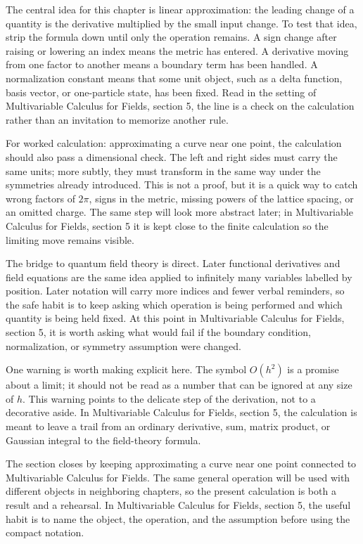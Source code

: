The central idea for this chapter is linear approximation: the leading change of a quantity is the derivative multiplied by the small input change.  To test that idea, strip the formula down until only the operation remains.  A sign change after raising or lowering an index means the metric has entered.  A derivative moving from one factor to another means a boundary term has been handled.  A normalization constant means that some unit object, such as a delta function, basis vector, or one-particle state, has been fixed.  Read in the setting of Multivariable Calculus for Fields, section 5, the line is a check on the calculation rather than an invitation to memorize another rule.

For worked calculation: approximating a curve near one point, the calculation should also pass a dimensional check.  The left and right sides must carry the same units; more subtly, they must transform in the same way under the symmetries already introduced.  This is not a proof, but it is a quick way to catch wrong factors of \(2\pi\), signs in the metric, missing powers of the lattice spacing, or an omitted charge.  The same step will look more abstract later; in Multivariable Calculus for Fields, section 5 it is kept close to the finite calculation so the limiting move remains visible.

The bridge to quantum field theory is direct.  Later functional derivatives and field equations are the same idea applied to infinitely many variables labelled by position.  Later notation will carry more indices and fewer verbal reminders, so the safe habit is to keep asking which operation is being performed and which quantity is being held fixed.  At this point in Multivariable Calculus for Fields, section 5, it is worth asking what would fail if the boundary condition, normalization, or symmetry assumption were changed.

One warning is worth making explicit here.  The symbol \(O(h^2)\) is a promise about a limit; it should not be read as a number that can be ignored at any size of \(h\).  This warning points to the delicate step of the derivation, not to a decorative aside.  In Multivariable Calculus for Fields, section 5, the calculation is meant to leave a trail from an ordinary derivative, sum, matrix product, or Gaussian integral to the field-theory formula.

The section closes by keeping approximating a curve near one point connected to Multivariable Calculus for Fields.  The same general operation will be used with different objects in neighboring chapters, so the present calculation is both a result and a rehearsal.  In Multivariable Calculus for Fields, section 5, the useful habit is to name the object, the operation, and the assumption before using the compact notation.



